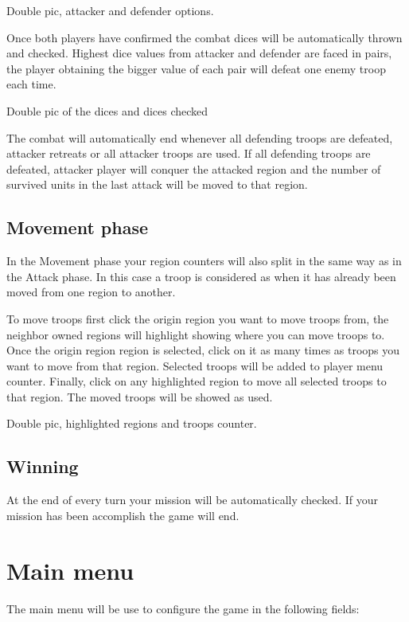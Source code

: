 \documentclass[12pt,a4paper]{article}
\begin{document}
\begin{todo}[Alberto]
  Double pic, attacker and defender options.
\end{todo}

Once both players have confirmed the combat dices will be automatically thrown and checked. Highest dice values from attacker and defender are faced in pairs, the player obtaining the bigger value of each pair will defeat one enemy troop each time.

\begin{todo}[Alberto]
  Double pic of the dices and dices checked
\end{todo} 

The combat will automatically end whenever all defending troops are defeated, attacker retreats or all attacker troops are used. If all defending troops are defeated, attacker player will conquer the attacked region and the number of survived units in the last attack will be moved to that region.

\subsection{Movement phase}
In the Movement phase your region counters will also split in the same way as in the Attack phase. In this case a troop is considered as when it has already been moved from one region to another.

To move troops first click the origin region you want to move troops from, the neighbor owned regions will highlight showing where you can move troops to. Once the origin region region is selected, click on it as many times as troops you want to move from that region. Selected troops will be added to player menu counter. Finally, click on any highlighted region to move all selected troops to that region. The moved troops will be showed as used.

\begin{todo}[Alberto]
  Double pic, highlighted regions and troops counter.
\end{todo}

\subsection{Winning}
At the end of every turn your mission will be automatically checked. If your mission has been accomplish the game will end.

\section{Main menu}
The main menu will be use to configure the game in the following fields:
\end{document}
